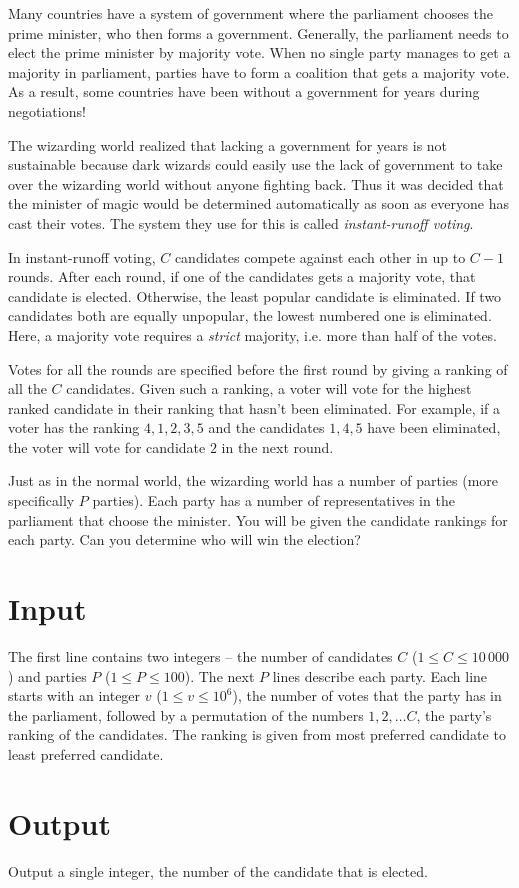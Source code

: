 
\noindent
Many countries have a system of government where the parliament chooses the prime minister, who then forms a government.
Generally, the parliament needs to elect the prime minister by majority vote.
When no single party manages to get a majority in parliament, parties have to form a coalition that gets a majority vote.
As a result, some countries have been without a government for years during negotiations!

The wizarding world realized that lacking a government for years is not sustainable because dark wizards could easily use the lack of government to take over the wizarding world without anyone fighting back.
Thus it was decided that the minister of magic would be determined automatically as soon as everyone has cast their votes.
The system they use for this is called \emph{instant-runoff voting}.

In instant-runoff voting, $C$ candidates compete against each other in up to $C - 1$ rounds.
After each round, if one of the candidates gets a majority vote, that candidate is elected.
Otherwise, the least popular candidate is eliminated.
If two candidates both are equally unpopular, the lowest numbered one is eliminated.
Here, a majority vote requires a \emph{strict} majority, i.e. more than half of the votes.

Votes for all the rounds are specified before the first round by giving a ranking of all the $C$ candidates.
Given such a ranking, a voter will vote for the highest ranked candidate in their ranking that hasn't been eliminated.
For example, if a voter has the ranking $4, 1, 2, 3, 5$ and the candidates $1, 4, 5$ have been eliminated, the voter will vote for candidate $2$ in the next round.

Just as in the normal world, the wizarding world has a number of parties (more specifically $P$ parties).
Each party has a number of representatives in the parliament that choose the minister.
You will be given the candidate rankings for each party.
Can you determine who will win the election?

\section*{Input}
The first line contains two integers -- the number of candidates $C$ ($1 \le C \le 10\,000$) and parties $P$ ($1 \le P \le 100$).
The next $P$ lines describe each party.
Each line starts with an integer $v$ ($1 \le v \le 10^6$), the number of votes that the party has in the parliament, followed by a permutation of the numbers $1, 2, \dots C$, the party's ranking of the candidates.
The ranking is given from most preferred candidate to least preferred candidate.

\section*{Output}
Output a single integer, the number of the candidate that is elected.
